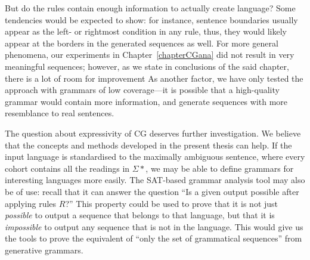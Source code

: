 But do the rules contain enough information to actually create language? 
Some tendencies would be expected to show: for instance, sentence boundaries usually appear 
as the left- or rightmost condition in any rule, thus, they would likely appear at the borders in the generated sequences as well.
For more general phenomena, our experiments in Chapter~\ref{chapterCGana} 
did not result in very meaningful sequences; 
however, as we state in conclusions of the said chapter, there is a lot of room for improvement 
As another factor, we have only tested the approach with grammars of low coverage---it is possible that a high-quality grammar would contain more information, and generate sequences with more resemblance to real sentences.

The question about expressivity of CG deserves further investigation. 
We believe that the concepts and methods developed in the present thesis can help. 
If the input language is standardised to the maximally ambiguous sentence, 
where every cohort contains all the readings in $\Sigma*$, 
we may be able to define grammars for interesting languages more easily. 
The SAT-based grammar analysis tool may also be of use: recall that it can answer 
the question ``Is a given output possible after applying rules $R$?''
This property could be used to prove that it is not just {\em possible} to output 
a sequence that belongs to that language, but that it is {\em impossible} to output 
any sequence that is not in the language.
This would give us the tools to prove the equivalent of ``only the set of grammatical sequences'' from generative grammars.







